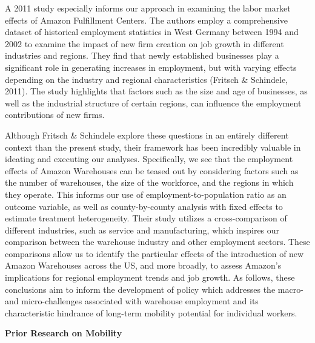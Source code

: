 \documentclass[11pt]{article}
\begin{document}
\begin{text}
\-\hspace{0.5cm} A 2011 study especially informs our approach in examining the labor market effects of Amazon Fulfillment Centers. The authors employ a comprehensive dataset of historical employment statistics in West Germany between 1994 and 2002 to examine the impact of new firm creation on job growth in different industries and regions. They find that newly established businesses play a significant role in generating increases in employment, but with varying effects depending on the industry and regional characteristics (Fritsch \& Schindele, 2011). The study highlights that factors such as the size and age of businesses, as well as the industrial structure of certain regions, can influence the employment contributions of new firms.  

\-\hspace{0.5cm} Although Fritsch \& Schindele explore these questions in an entirely different context than the present study, their framework has been incredibly valuable in ideating and executing our analyses. Specifically, we see that the employment effects of Amazon Warehouses can be teased out by considering factors such as the number of warehouses, the size of the workforce, and the regions in which they operate. This informs our use of employment-to-population ratio as an outcome variable, as well as county-by-county analysis with fixed effects to estimate treatment heterogeneity. Their study utilizes a cross-comparison of different industries, such as service and manufacturing, which inspires our comparison between the warehouse industry and other employment sectors. These comparisons allow us to identify the particular effects of the introduction of new Amazon Warehouses across the US, and more broadly, to assess Amazon's implications for regional employment trends and job growth. As follows, these conclusions aim to inform the development of policy which addresses the macro- and micro-challenges associated with warehouse employment and its characteristic hindrance of long-term mobility potential for individual workers.\bigskip

\begin{center}
    \textbf{Prior Research on Mobility}
\end{center} 


\end{text}
\end{document}
